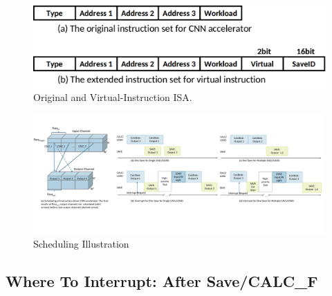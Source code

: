 





\begin{figure}[t]
	\centering
	\includegraphics[width=0.99\linewidth]{fig/instructions.png}
	\caption{Original and Virtual-Instruction ISA.}
	\label{fig:instructions}
\end{figure}



\begin{figure}[t]
    \centering
	\includegraphics[width=0.99\textwidth]{fig/singlesave.pdf} 	
    \caption{
		Scheduling Illustration
    }
	\label{fig:singlesave}
\end{figure}

\subsection{ Where To Interrupt: After Save/CALC\_F }
\label{sec:whereinter}





